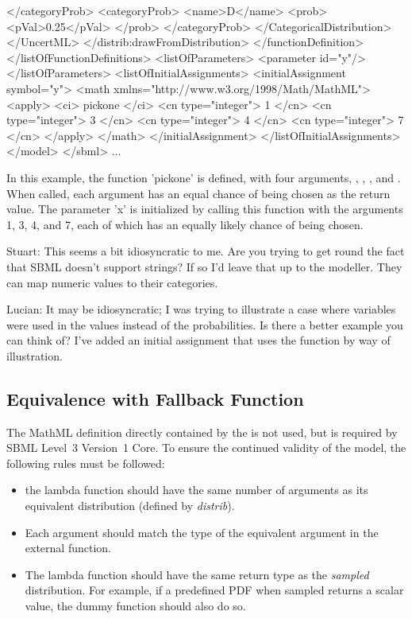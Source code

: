 \documentclass[draftspec]{sbmlpkgspec}
\newcommand{\sbmlthreecore}{SBML Level~3 Version~1 Core\xspace}
\newcommand{\distribshort}{\emph{distrib}\xspace}
\newcommand{\mathml}{MathML\xspace}
\newcommand{\controversial}{\marginpar{\hspace*{34pt}\raisebox{-0.5ex}{\Large?}}}
\begin{document}
\begin{example}
              </categoryProb>
              <categoryProb>
                <name>D</name>
                <prob>
                  <pVal>0.25</pVal>
                </prob>
              </categoryProb>
            </CategoricalDistribution>
          </UncertML>
        </distrib:drawFromDistribution>
      </functionDefinition>
    </listOfFunctionDefinitions>
    <listOfParameters>
      <parameter id="y"/>
    </listOfParameters>
    <listOfInitialAssignments>
      <initialAssignment symbol="y">
        <math xmlns="http://www.w3.org/1998/Math/MathML">
          <apply>
            <ci> pickone </ci>
            <cn type="integer"> 1 </cn>
            <cn type="integer"> 3 </cn>
            <cn type="integer"> 4 </cn>
            <cn type="integer"> 7 </cn>
          </apply>
        </math>
      </initialAssignment>
    </listOfInitialAssignments>
  </model>
</sbml>
...
\end{example}

In this example, the function 'pickone' is defined, with four arguments, , , , and .  When called, each argument has an equal chance of being chosen as the return value.  The parameter 'x' is initialized by calling this function with the arguments 1, 3, 4, and 7, each of which has an equally likely chance of being chosen.

{\color{red} Stuart: \controversial This seems a bit idiosyncratic to me. Are you trying to get
  round the fact that SBML doesn't support strings? If so I'd leave
  that up to the modeller. They can map numeric values to their
  categories.  }

{\color{red} Lucian: \controversial It may be idiosyncratic; I was trying to illustrate a case where variables were used in the values instead of the probabilities.  Is there a better example you can think of?  I've added an initial assignment that uses the function by way of illustration.}

\subsection{Equivalence with Fallback Function}
\label{sec:fallbackfunc}

The \mathml definition directly contained by the
 is not used, but is required by \sbmlthreecore.  To ensure the continued validity of the model, the following rules must be followed:

\begin{itemize}
\item the lambda function should have the same number of arguments as
  its equivalent distribution (defined by \distribshort).
\item Each argument should match the type of the equivalent argument
  in the external function.
\item The lambda function should have the same return type as the
  \emph{sampled} distribution. For example, if a predefined PDF when
  sampled returns a scalar value, the dummy function should also do so.
\end{itemize}
\end{document}
